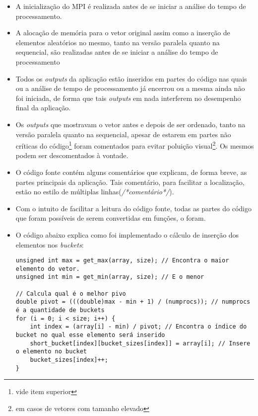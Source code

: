		\begin{itemize}
			\item A inicialização do MPI é realizada antes de se iniciar a análise do tempo de processamento.
			\item A alocação de memória para o vetor original assim como a inserção de elementos aleatórios no mesmo, tanto na versão paralela quanto na sequencial, são realizadas antes de se iniciar a análise do tempo de processamento 
			\item Todos os \textit{outputs} da aplicação estão inseridos em partes do código nas quais ou a análise de tempo de processamento já encerrou ou a mesma ainda não foi iniciada, de forma que tais \textit{outputs} em nada interferem no desempenho final da aplicação.
			\item Os \textit{outputs} que mostravam o vetor antes e depois de ser ordenado, tanto na versão paralela quanto na sequencial, apesar de estarem em partes não críticas do código\footnote{vide item superior} foram comentados para evitar poluição visual\footnote{em casos de vetores com tamanho elevado}. Os mesmos podem ser descomentados à vontade.
			\item O código fonte contém alguns comentários que explicam, de forma breve, as partes principais da aplicação. Tais comentário, para facilitar a localização, estão no estilo de múltiplas linhas(\textit{/*comentário*/}).
			
			\item Com o intuito de facilitar a leitura do código fonte, todas as partes do código que foram possíveis de serem convertidas em funções, o foram.
			
			\item O código abaixo explica como foi implementado o cálculo de inserção dos elementos nos \textit{buckets}:\\
			\begin{lstlisting}[style=C] 
unsigned int max = get_max(array, size); // Encontra o maior elemento do vetor.
unsigned int min = get_min(array, size); // E o menor

// Calcula qual é o melhor pivo
double pivot = (((double)max - min + 1) / (numprocs)); // numprocs é a quantidade de buckets
for (i = 0; i < size; i++) {
	int index = (array[i] - min) / pivot; // Encontra o índice do bucket no qual esse elemento será inserido
	short_bucket[index][bucket_sizes[index]] = array[i]; // Insere o elemento no bucket
	bucket_sizes[index]++;
}
\end{lstlisting}
		\end{itemize}